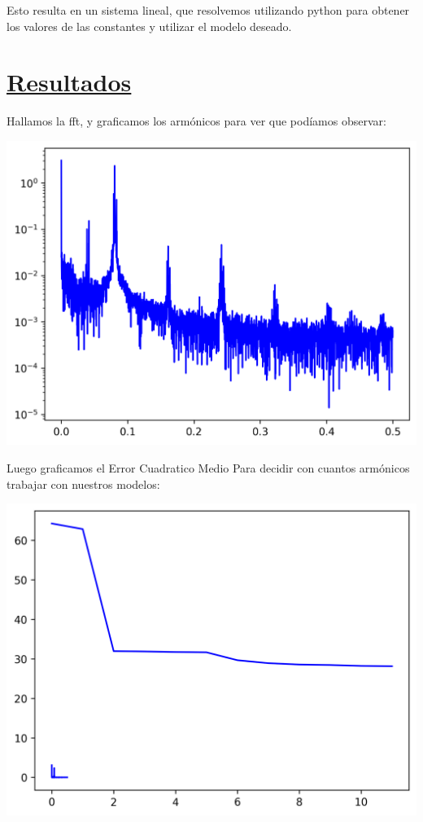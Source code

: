 \documentclass[10pt,a4paper]{article}
\numberwithin{equation}{section}
\numberwithin{figure}{section}
\numberwithin{table}{section}
\begin{document}
Esto resulta en un sistema lineal, que resolvemos utilizando python para obtener los valores de las constantes y utilizar el modelo deseado.

    
\section{\underline{Resultados}}

Hallamos la fft, y graficamos los armónicos para ver que podíamos observar:\\
\begin{minipage}{\textwidth}
\centering
    \includegraphics[scale=1]{ Images/ejercicio_a_fft_log.png}\\
 \label{fig:fig1}
\end{minipage}
Luego graficamos el Error Cuadratico Medio  Para decidir con cuantos armónicos trabajar con nuestros modelos:
\begin{minipage}{\textwidth}
    \centering
        \includegraphics[scale=1]{ Images/ejercicio_a_ecm_x_12armonicos.png}\\
     \label{fig:fig2}
\end{minipage}
\end{document}
